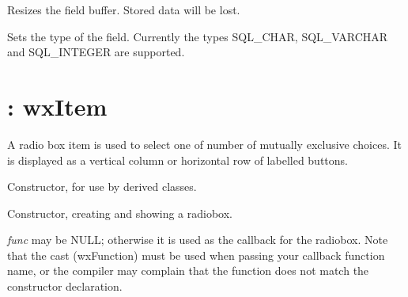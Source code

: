 

Resizes the field buffer. Stored data will be lost.
  


Sets the type of the field. Currently the types SQL\_CHAR, SQL\_VARCHAR and
SQL\_INTEGER are supported.


\section{: wxItem}\label{wxradiobox}

A radio box item is used to select one of number of mutually exclusive
choices.  It is displayed as a vertical column or horizontal row of
labelled buttons.

\label{constrradiobox}


Constructor, for use by derived classes.



Constructor, creating and showing a radiobox.

{\it func} may be NULL; otherwise it is used as the callback for the
radiobox.  Note that the cast (wxFunction) must be used when passing your
callback function name, or the compiler may complain that the function
does not match the constructor declaration.

